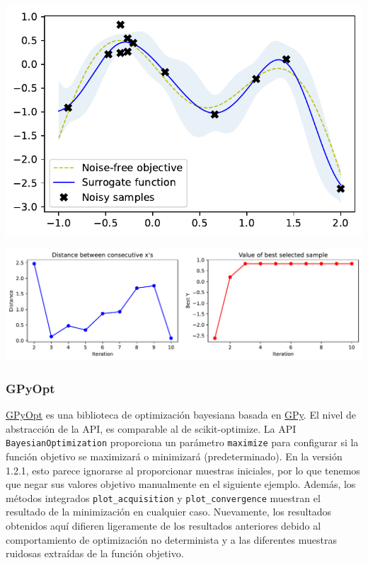 \documentclass[
  12pt,
  letterpaper,
  DIV=11,
  numbers=noendperiod]{scrartcl}
\begin{document}
\includegraphics{ProyFinal_OptBayesiana_2024_y_files/figure-pdf/cell-8-output-1.pdf}

\includegraphics{ProyFinal_OptBayesiana_2024_y_files/figure-pdf/cell-9-output-1.pdf}

\subsubsection{GPyOpt}\label{gpyopt}

\href{http://sheffieldml.github.io/GPyOpt/}{GPyOpt} es una biblioteca de
optimización bayesiana basada en
\href{https://sheffieldml.github.io/GPy/}{GPy}. El nivel de abstracción
de la API, es comparable al de scikit-optimize. La API
\texttt{BayesianOptimization} proporciona un parámetro \texttt{maximize}
para configurar si la función objetivo se maximizará o minimizará
(predeterminado). En la versión 1.2.1, esto parece ignorarse al
proporcionar muestras iniciales, por lo que tenemos que negar sus
valores objetivo manualmente en el siguiente ejemplo. Además, los
métodos integrados \texttt{plot\_acquisition} y
\texttt{plot\_convergence} muestran el resultado de la minimización en
cualquier caso. Nuevamente, los resultados obtenidos aquí difieren
ligeramente de los resultados anteriores debido al comportamiento de
optimización no determinista y a las diferentes muestras ruidosas
extraídas de la función objetivo.
\end{document}
